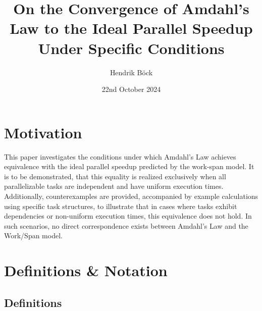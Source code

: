 \documentclass[
  a4paper, %
]{kaohandt}
\begin{document}
\pagestyle{centeredpagenum.scrheadings}

\title{On the Convergence of Amdahl's Law to the Ideal Parallel Speedup Under Specific Conditions}

\author[HB]{Hendrik B\"ock}

\date{22nd October 2024}


\maketitle

\margintoc


\section{Motivation}

This paper investigates the conditions under which Amdahl's Law achieves equivalence with the ideal parallel speedup predicted by the work-span model. It is to be demonstrated, that this equality is realized exclusively when all parallelizable tasks are independent and have uniform execution times. Additionally, counterexamples are provided, accompanied by example calculations using specific task structures, to illustrate that in cases where tasks exhibit dependencies or non-uniform execution times, this equivalence does not hold. In such scenarios, no direct correspondence exists between Amdahl's Law and the Work/Span model.

\section{Definitions \& Notation}

\subsection{Definitions}
\end{document}

